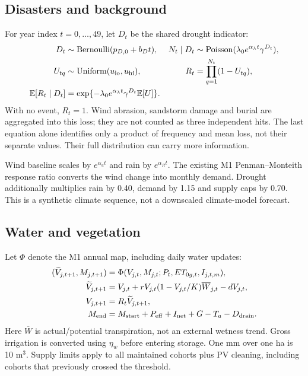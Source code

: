 \documentclass[11pt,a4paper]{article}
\newcommand{\E}{\mathbb E}
\begin{document}
\subsection*{Disasters and background}
For year index $t=0,\ldots,49$, let $D_t$ be the shared drought indicator:
\begin{align}
D_t&\sim\operatorname{Bernoulli}(p_{D,0}+b_Dt), &
N_t\mid D_t&\sim\operatorname{Poisson}(\lambda_0 e^{\alpha_\lambda t}\gamma^{D_t}),\\
U_{tq}&\sim\operatorname{Uniform}(u_{\rm lo},u_{\rm hi}), &
R_t&=\prod_{q=1}^{N_t}(1-U_{tq}),\\
\E[R_t\mid D_t]&=\exp\{-\lambda_0e^{\alpha_\lambda t}\gamma^{D_t}\E[U]\}.&&
\end{align}
With no event, $R_t=1$. Wind abrasion, sandstorm damage and burial are aggregated into this loss;
they are not counted as three independent hits. The last equation alone identifies only a product
of frequency and mean loss, not their separate values. Their full distribution can carry more information.

Wind baseline scales by $e^{\alpha_ut}$ and rain by $e^{\alpha_Rt}$.
The existing M1 Penman--Monteith response ratio converts the wind change into monthly demand.
Drought additionally multiplies rain by 0.40, demand by 1.15 and supply caps by 0.70.
This is a synthetic climate sequence, not a downscaled climate-model forecast.

\subsection*{Water and vegetation}
Let $\Phi$ denote the M1 annual map, including daily water updates:
\begin{align}
(\widetilde V_{j,t+1},M_{j,t+1})&=\Phi(V_{j,t},M_{j,t};P_t,ET_{0g,t},I_{j,t,m}),\\
\widetilde V_{j,t+1}&=V_{j,t}+rV_{j,t}(1-V_{j,t}/K)\overline W_{j,t}-dV_{j,t},\\
V_{j,t+1}&=R_t\widetilde V_{j,t+1},\\
M_{\rm end}&=M_{\rm start}+P_{\rm eff}+I_{\rm net}+G-T_a-D_{\rm drain}.
\end{align}
Here $\overline W$ is actual/potential transpiration, not an external wetness trend.
Gross irrigation is converted using $\eta_w$ before entering storage. One mm over one ha is 10 m$^3$.
Supply limits apply to all maintained cohorts plus PV cleaning, including cohorts that previously crossed the threshold.
\end{document}
